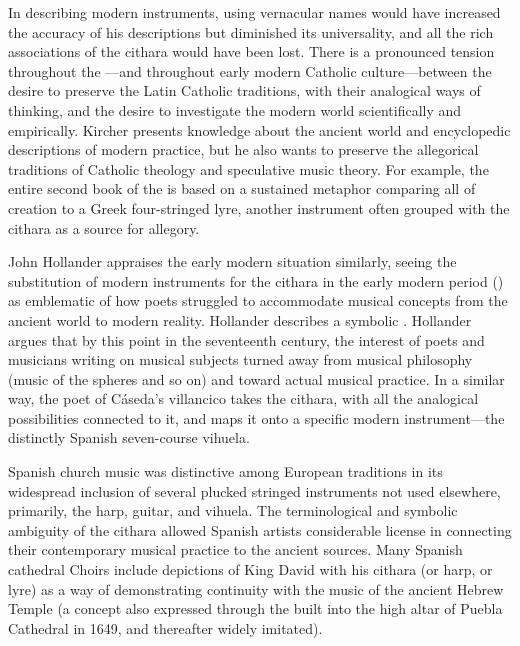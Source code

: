 In describing modern instruments, using vernacular names would have increased the accuracy of his descriptions but diminished its universality, and all the rich associations of the cithara would have been lost.
There is a pronounced tension throughout the ---and throughout early modern Catholic culture---between the desire to preserve the Latin Catholic traditions, with their analogical ways of thinking, and the desire to investigate the modern world scientifically and empirically.
Kircher presents  knowledge about the ancient world and encyclopedic descriptions of modern practice, but he also wants to preserve the allegorical traditions of Catholic theology and speculative music theory.
For example, the entire second book of the  is based on a sustained metaphor comparing all of creation to a Greek four-stringed lyre, another instrument often grouped with the cithara as a source for allegory.

John Hollander appraises the early modern situation similarly, seeing the substitution of modern instruments for the cithara in the early modern period () as emblematic of how poets struggled to accommodate musical concepts from the ancient world to modern reality.
Hollander describes a symbolic .%
	\autocite[44--51]{Hollander:Untuning}
Hollander argues that by this point in the seventeenth century, the interest of poets and musicians writing on musical subjects turned away from musical philosophy (music of the spheres and so on) and toward actual musical practice. 
In a similar way, the poet of Cáseda's villancico takes the cithara, with all the analogical possibilities connected to it, and maps it onto a specific modern instrument---the distinctly Spanish seven-course vihuela.

Spanish church music was distinctive among European traditions in its widespread inclusion of several plucked stringed instruments not used elsewhere, primarily, the harp, guitar, and vihuela. 
The terminological and symbolic ambiguity of the cithara allowed Spanish artists considerable license in connecting their contemporary musical practice to the ancient sources.
Many Spanish cathedral Choirs include depictions of King David with his cithara (or harp, or lyre) as a way of demonstrating continuity with the music of the ancient Hebrew Temple (a concept also expressed through the  built into the high altar of Puebla Cathedral in 1649, and thereafter widely imitated). 

